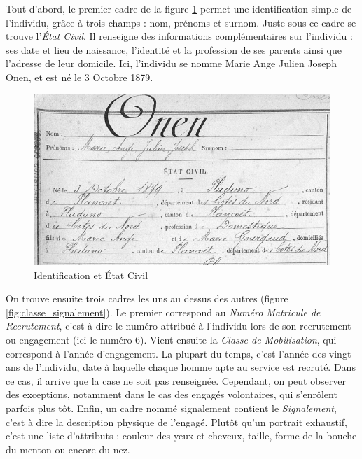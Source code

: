 \documentclass[a4paper]{article}
\begin{document}
    Tout d'abord, le premier cadre de la figure \ref{fig:id_etatcivil} permet une identification simple de l'individu, gr\^ace \`a trois champs : nom, pr\'enoms et surnom. Juste sous ce cadre se trouve l'\textit{\'Etat Civil}. Il renseigne des informations compl\'ementaires sur l'individu : ses date et lieu de naissance, l'identit\'e et la profession de ses parents ainsi que l'adresse de leur domicile. Ici, l'individu se nomme Marie Ange Julien Joseph Onen, et est n\'e le 3 Octobre 1879.
    
\begin{figure}[H]
\centering
\includegraphics[width=1.0\textwidth]{Identification_EtatCivil_2.PNG}
\caption{\label{fig:id_etatcivil}Identification et \'Etat Civil}
\end{figure}
	    
    On trouve ensuite trois cadres les uns au dessus des autres (figure \ref{fig:classe_signalement}). Le premier correspond au \textit{Num\'ero Matricule de Recrutement}, c'est \`a dire le num\'ero attribu\'e \`a l'individu lors de son recrutement ou engagement (ici le num\'ero 6). Vient ensuite la \textit{Classe de Mobilisation}, qui correspond \`a l'ann\'ee d'engagement. La plupart du temps, c'est l'ann\'ee des vingt ans de l'individu, date \`a laquelle chaque homme apte au service est recrut\'e. Dans ce cas, il arrive que la case ne soit pas renseign\'ee. Cependant, on peut observer des exceptions, notamment dans le cas des engag\'es volontaires, qui s'enr\^olent parfois plus t\^ot. Enfin, un cadre nomm\'e signalement contient le \textit{Signalement}, c'est \`a dire la description physique de l'engag\'e. Plut\^ot qu'un portrait exhaustif, c'est une liste d'attributs : couleur des yeux et cheveux, taille, forme de la bouche du menton ou encore du nez.
    
\end{document}
